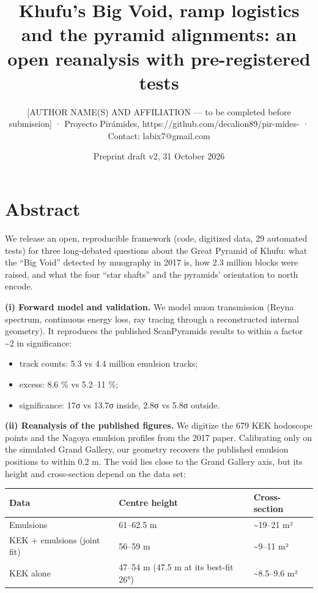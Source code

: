 \documentclass[
]{article}
\title{Khufu's Big Void, ramp logistics and the pyramid alignments: an
open reanalysis with pre-registered tests}
\author{{[}AUTHOR NAME(S) AND AFFILIATION --- to be completed before
submission{]} · Proyecto Pirámides,
https://github.com/decalion89/pir-mides- · Contact: labix7@gmail.com}
\date{Preprint draft v2, 31 October 2026}
\providecommand{\tightlist}{%
  \setlength{\itemsep}{0pt}\setlength{\parskip}{0pt}}
\begin{document}
\maketitle

\hypertarget{abstract}{%
\section{Abstract}\label{abstract}}

We release an open, reproducible framework (code, digitized data, 29
automated tests) for three long-debated questions about the Great
Pyramid of Khufu: what the ``Big Void'' detected by muography in 2017
is, how 2.3 million blocks were raised, and what the four ``star
shafts'' and the pyramids' orientation to north encode.

\textbf{(i) Forward model and validation.} We model muon transmission
(Reyna spectrum, continuous energy loss, ray tracing through a
reconstructed internal geometry). It reproduces the published
ScanPyramids results to within a factor \textasciitilde2 in
significance:

\begin{itemize}
\tightlist
\item
  track counts: 5.3 vs 4.4 million emulsion tracks;
\item
  excess: 8.6 \% vs 5.2--11 \%;
\item
  significance: 17σ vs 13.7σ inside, 2.8σ vs 5.8σ outside.
\end{itemize}

\textbf{(ii) Reanalysis of the published figures.} We digitize the 679
KEK hodoscope points and the Nagoya emulsion profiles from the 2017
paper. Calibrating only on the simulated Grand Gallery, our geometry
recovers the published emulsion positions to within 0.2 m. The void lies
close to the Grand Gallery axis, but its height and cross-section depend
on the data set:

\begin{longtable}[]{@{}lll@{}}
\toprule\noalign{}
Data & Centre height & Cross-section \\
\midrule\noalign{}
\endhead
\bottomrule\noalign{}
\endlastfoot
Emulsions & 61--62.5 m & \textasciitilde19--21 m² \\
KEK + emulsions (joint fit) & 56--59 m & \textasciitilde9--11 m² \\
KEK alone & 47--54 m (47.5 m at its best-fit 26°) &
\textasciitilde8.5--9.6 m² \\
\end{longtable}
\end{document}
